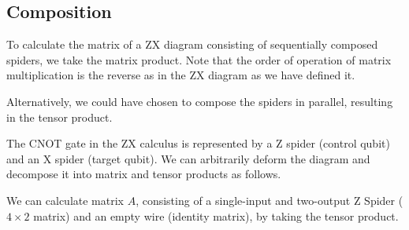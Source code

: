 
\subsection{Composition}

To calculate the matrix of a ZX diagram consisting of sequentially composed spiders, we take the matrix product. Note that the order of operation of matrix multiplication is the reverse as in the ZX diagram as we have defined it.


Alternatively, we could have chosen to compose the spiders in parallel, resulting in the tensor product.


The CNOT gate in the ZX calculus is represented by a Z spider (control qubit) and an X spider (target qubit). We can arbitrarily deform the diagram and decompose it into matrix and tensor products as follows.


We can calculate matrix $A$, consisting of a single-input and two-output Z Spider ($4 \times 2$ matrix) and an empty wire (identity matrix), by taking the tensor product.


